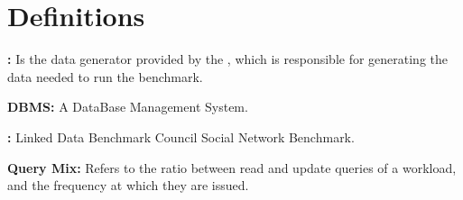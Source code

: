\chapter*{Definitions}

%
%
%
%
%
%
%
%
%
%


{\flushleft \textbf{\datagen:}} Is the data generator provided by the \ldbcsnb, which
is responsible for generating the data needed to run the benchmark.

{\flushleft \textbf{DBMS:}} A DataBase Management System. 

{\flushleft \textbf{\ldbcsnb:}} Linked Data Benchmark Council Social Network Benchmark. 

{\flushleft \textbf{Query Mix:}} Refers to the ratio between read and update queries
of a workload, and the frequency at which they are issued.

